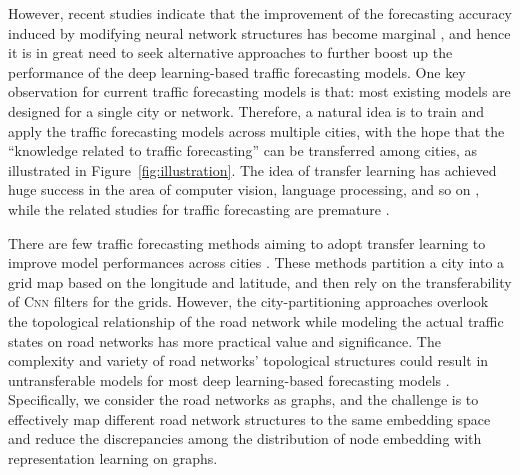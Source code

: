 \documentclass[sigconf]{acmart}
\theoremstyle{definition}
\begin{document}
However, recent studies indicate that the improvement of the forecasting accuracy induced by modifying neural network structures has become marginal \cite{jiang2021graph}, and hence it is in great need to seek alternative approaches to further boost up the performance of the deep learning-based traffic forecasting models. One key observation for current traffic forecasting models is that: most existing models are designed for a single city or network. Therefore, a natural idea is to train and apply the traffic forecasting models across multiple cities, with the hope that the ``knowledge related to traffic forecasting'' can be transferred among cities, as illustrated in Figure~\ref{fig:illustration}. The idea of transfer learning has achieved huge success in the area of computer vision, language processing, and so on \cite{pan2009survey,patel2015visual,liu2019survey}, while the related studies for traffic forecasting are premature \cite{yin2021deep}.

There are few traffic forecasting methods aiming to adopt transfer learning to improve model performances across cities \cite{wang2018cross,pan2020spatio,yao2019learning,wang2021spatio,tian2021transfer}. These methods partition a city into a grid map based on the longitude and latitude, and then rely on the transferability of \textsc{Cnn} filters for the grids. However, the city-partitioning approaches overlook the topological relationship of the road network while modeling the actual traffic states on road networks has more practical value and significance. 
The complexity and variety of road networks' topological structures could result in untransferable models for most deep learning-based forecasting models \cite{mallick2021transfer}. Specifically, we consider the road networks as graphs, and the challenge is to effectively map different road network structures to the same embedding space and reduce the discrepancies among the distribution of node embedding with representation learning on graphs.
\end{document}
